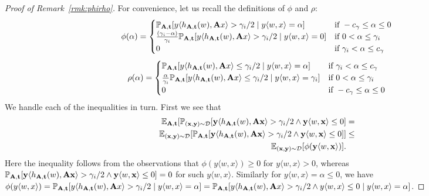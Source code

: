 \begin{proof}[Proof of Remark~\ref{rmk:phirho}]
For convenience, let us recall the definitions of $\phi$ and $\rho$:
\[
\phi(\alpha) = \begin{cases} \mathbb{P}_{\mathbf{A}, \mathbf{t}}[y \langle h_{\mathbf{A},\mathbf{t}}(w), \mathbf{A} x\rangle > \gamma_i/2 \mid y \langle w, x \rangle = \alpha] & \text{if } -c_\gamma \leq \alpha \leq 0 \\
                      \frac{(\gamma_i-\alpha)}{\gamma_i}\mathbb{P}_{\mathbf{A}, \mathbf{t}}[y \langle h_{\mathbf{A},\mathbf{t}}(w), \mathbf{A} x\rangle > \gamma_i/2 \mid y \langle w, x \rangle = 0]                                    & \text{if } 0 < \alpha \leq \gamma_i      \\
                      0 & \text{if } \gamma_i < \alpha \leq c_\gamma
        \end{cases}
\]
\[
\rho(\alpha) = \begin{cases} \mathbb{P}_{\mathbf{A}, \mathbf{t}}[y \langle h_{\mathbf{A},\mathbf{t}}(w), \mathbf{A} x\rangle \leq \gamma_i/2 \mid y \langle w, x \rangle = \alpha] & \text{if } \gamma_i < \alpha \leq c_\gamma \\
                      \frac{\alpha}{\gamma_i}\mathbb{P}_{\mathbf{A}, \mathbf{t}}[y \langle h_{\mathbf{A},\mathbf{t}}(w), \mathbf{A} x\rangle \leq \gamma_i/2 \mid y \langle w, x \rangle = \gamma_i]                                    & \text{if } 0 < \alpha \leq \gamma_i      \\
                      0 & \text{if } -c_\gamma \leq \alpha \leq 0
        \end{cases}
\]
We handle each of the inequalities in turn. First we see that
\begin{align*}
\mathbb{E}_{\mathbf{A},\mathbf{t}} [\mathbb{P}_{(\mathbf{x},\mathbf{y}) \sim \mathcal{D}}[\mathbf{y} \langle h_{\mathbf{A},\mathbf{t}}(w), \mathbf{A} \mathbf{x}\rangle > \gamma_i/2 \wedge \mathbf{y} \langle w, \mathbf{x}\rangle \leq 0] &= \\
\mathbb{E}_{(\mathbf{x},\mathbf{y}) \sim \mathcal{D}}[\mathbb{P}_{\mathbf{A},\mathbf{t}} [\mathbf{y} \langle h_{\mathbf{A},\mathbf{t}}(w), \mathbf{A} \mathbf{x}\rangle > \gamma_i/2 \wedge \mathbf{y} \langle w, \mathbf{x}\rangle \leq 0]] 
&\leq \\
\mathbb{E}_{(\mathbf{x},\mathbf{y}) \sim \mathcal{D}}[\phi(\mathbf{y} \langle w, \mathbf{x} \rangle)].
\end{align*}
Here the inequality follows from the observations that $\phi(y \langle w, x \rangle) \geq 0$ for $y \langle w, x \rangle > 0$, whereas $\mathbb{P}_{\mathbf{A},\mathbf{t}} [\mathbf{y} \langle h_{\mathbf{A},\mathbf{t}}(w), \mathbf{A} \mathbf{x}\rangle > \gamma_i/2 \wedge \mathbf{y} \langle w, \mathbf{x}\rangle \leq 0] = 0$ for such $y \langle w, x \rangle$. Similarly for $y\langle w, x \rangle = \alpha \leq 0$, we have $\phi(y \langle w, x \rangle) = \mathbb{P}_{\mathbf{A},\mathbf{t}}[y\langle h_{\mathbf{A},\mathbf{t}}(w),\mathbf{A} x\rangle > \gamma_i/2 \mid y\langle w, x \rangle = \alpha] = \mathbb{P}_{\mathbf{A},\mathbf{t}}[y\langle h_{\mathbf{A},\mathbf{t}}(w),\mathbf{A} x\rangle > \gamma_i/2 \wedge y \langle w,x\rangle \leq 0 \mid y\langle w, x \rangle = \alpha]$.


\end{proof}
